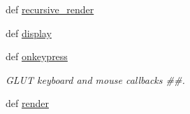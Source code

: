 \begin{DoxyCompactItemize}
\item 
def \hyperlink{classfixed__pipeline__3d__viewer_1_1_g_l_renderer_a3387a4806b9759ce0d59225ac7acfe97}{recursive\+\_\+render}
\item 
def \hyperlink{classfixed__pipeline__3d__viewer_1_1_g_l_renderer_af991fe369b4d64f2e5ebae70185b04e0}{display}
\item 
\hypertarget{classfixed__pipeline__3d__viewer_1_1_g_l_renderer_a342ca7da76df9c1f4403779a4264fc74}{def \hyperlink{classfixed__pipeline__3d__viewer_1_1_g_l_renderer_a342ca7da76df9c1f4403779a4264fc74}{onkeypress}}\label{classfixed__pipeline__3d__viewer_1_1_g_l_renderer_a342ca7da76df9c1f4403779a4264fc74}

\begin{DoxyCompactList}\small\item\em G\+L\+U\+T keyboard and mouse callbacks \#\#. \end{DoxyCompactList}\item 
def \hyperlink{classfixed__pipeline__3d__viewer_1_1_g_l_renderer_a5dfe5225ce2a1e23d3b55fbe698c82fd}{render}
\end{DoxyCompactItemize}
